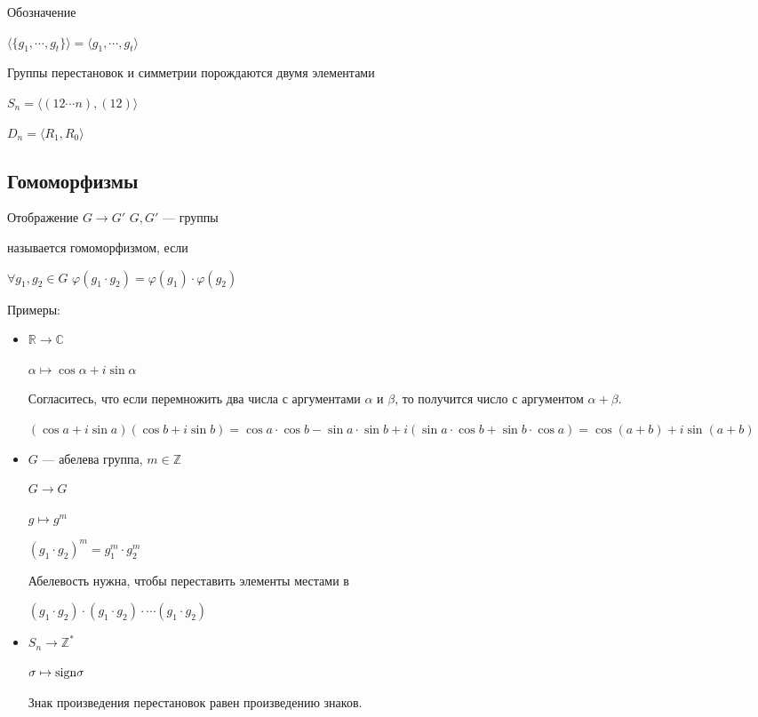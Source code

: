 \notice Обозначение

$\langle \{ g_1, \cdots, g_t \} \rangle = \langle g_1, \cdots, g_t \rangle$

\notice Группы перестановок и симметрии порождаются двумя элементами

$S_n = \langle (1 2 \cdots n), (12) \rangle$

$D_n = \langle R_1, R_0 \rangle $

\subsection{Гомоморфизмы}

\begin{conj}
  Отображение $G \longrightarrow G'$ $G, G'$ --- группы

  называется гомоморфизмом, если 

  $\forall g_1, g_2 \in G$ $\varphi(g_1 \cdot g_2) = \varphi(g_1) \cdot \varphi(g_2)$
\end{conj}

Примеры:
\begin{itemize}
  \item $\mathbb{R} \longrightarrow \mathbb{C}$
  
  $\alpha \mapsto \cos{\alpha} + i\sin{\alpha}$

  Согласитесь, что если перемножить два числа с аргументами $\alpha$ и $\beta$, то получится число с аргументом $\alpha + \beta$.

  $(\cos{a} + i\sin{a})(\cos{b} + i\sin{b}) = \cos{a}\cdot\cos{b} - \sin{a}\cdot\sin{b} + i(\sin{a}\cdot\cos{b} + \sin{b}\cdot\cos{a}) = \cos(a + b) + i\sin(a + b)$

  \item $G$ --- абелева группа, $m\in \mathbb{Z}$
  
  $G \longrightarrow G$

  $g \mapsto g^m$

  $(g_1 \cdot g_2)^m = g_1^m \cdot g_2^m$
  
  Абелевость нужна, чтобы переставить элементы местами в 
  
  $(g_1 \cdot g_2) \cdot (g_1 \cdot g_2) \cdot \cdots (g_1 \cdot g_2)$

  \item  $S_n \longrightarrow \mathbb{Z}^*$

  $\sigma \mapsto \operatorname{sign \sigma}$

  Знак произведения перестановок равен произведению знаков.
\end{itemize}


